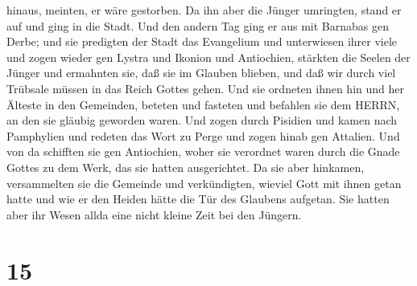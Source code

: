 hinaus, meinten, er wäre gestorben.  Da ihn aber die Jünger
umringten, stand er auf und ging in die Stadt. Und den andern Tag ging
er aus mit Barnabas gen Derbe;  und sie predigten der Stadt
das Evangelium und unterwiesen ihrer viele und zogen wieder gen Lystra
und Ikonion und Antiochien,  stärkten die Seelen der Jünger
und ermahnten sie, daß sie im Glauben blieben, und daß wir durch viel
Trübsale müssen in das Reich Gottes gehen.  Und sie
ordneten ihnen hin und her Älteste in den Gemeinden, beteten und
fasteten und befahlen sie dem HERRN, an den sie gläubig geworden waren.
 Und zogen durch Pisidien und kamen nach Pamphylien
 und redeten das Wort zu Perge und zogen hinab gen
Attalien.  Und von da schifften sie gen Antiochien, woher
sie verordnet waren durch die Gnade Gottes zu dem Werk, das sie hatten
ausgerichtet.  Da sie aber hinkamen, versammelten sie die
Gemeinde und verkündigten, wieviel Gott mit ihnen getan hatte und wie er
den Heiden hätte die Tür des Glaubens aufgetan.  Sie hatten
aber ihr Wesen allda eine nicht kleine Zeit bei den Jüngern.

\hypertarget{section-14}{%
\section{15}\label{section-14}}

